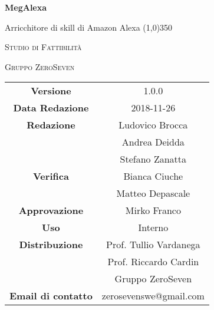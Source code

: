 \documentclass[a4paper,12pt]{book}
\author{Mirko Franco}
\date{26-11-2018}
\begin{document}
\begin{titlepage}
	\centering
	{\huge\bfseries MegAlexa\par}
	Arricchitore di skill di Amazon Alexa
	\line(1,0){350} \\
	{\scshape\LARGE Studio di Fattibilità \par}
	\vspace{1cm}
	{\scshape Gruppo ZeroSeven \par}
	\logo
	\begin{tabular}{c|c}
		{\hfill \textbf{Versione}} 			& 1.0.0			\\
		{\hfill\textbf{Data Redazione}} 	& 2018-11-26	\\ 
		{\hfill\textbf{Redazione}} 			&  		Ludovico Brocca \\ & Andrea Deidda\\ & Stefano Zanatta		\\
		{\hfill\textbf{Verifica}} 				&  					Bianca Ciuche \\ & Matteo Depascale\\ 
		{\hfill\textbf{Approvazione}} 		&  				Mirko Franco\\ 
		{\hfill\textbf{Uso}} 					& 		Interno		\\ 
		{\hfill\textbf{Distribuzione}} 			& 			Prof. Tullio Vardanega \\ & Prof. Riccardo Cardin \\ & Gruppo ZeroSeven		\\ 
		{\hfill\textbf{Email di contatto}} & zerosevenswe@gmail.com \\
	\end{tabular}
\end{titlepage}
	

	
\label{LastFrontPage}
	\newpage	
	
	\pagestyle{mymain}
	\tableofcontents
		
	
	
	
	
	
		
	
	\label{LastPage}
\end{document}
